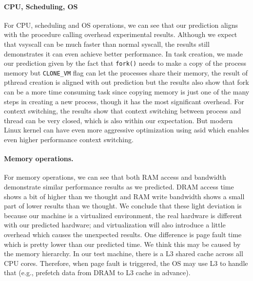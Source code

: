 \paragraph{CPU, Scheduling, OS} For CPU, scheduling and OS operations, we can see that our prediction aligns with the procedure calling overhead experimental results. Although we expect that vsyscall can be much faster than normal syscall, the results still demonstrates it can even achieve better performance. In task creation, we made our prediction given by the fact that \texttt{fork()} needs to make a copy of the process memory but \texttt{CLONE\_VM} flag can let the processes share their memory, the result of pthread creation is aligned with out prediction but the results also show that fork can be a more time consuming task since copying memory is just one of the many steps in creating a new process, though it has the most significant overhead. For context switching, the results show that context switching between process and thread can be very closed, which is also within our expectation. But modern Linux kernel can have even more aggressive optimization using asid which enables even higher performance context switching. 

\paragraph{Memory operations.} For memory operations, we can see that both RAM access and bandwidth demonstrate similar performance results as we predicted. DRAM access time shows a bit of higher than we thought and RAM write bandwidth shows a small part of lower results than we thought. We conclude that these light deviation is because our machine is a virtualized environment, the real hardware is different with our predicted hardware; and virtualization will also introduce a little overhead which causes the unexpected results. One difference is page fault time which is pretty lower than our predicted time. We think this may be caused by the memory hierarchy. In our test machine, there is a L3 shared cache across all CPU cores. Therefore, when page fault is triggered, the OS may use L3 to handle that (e.g., prefetch data from DRAM to L3 cache in advance). 

